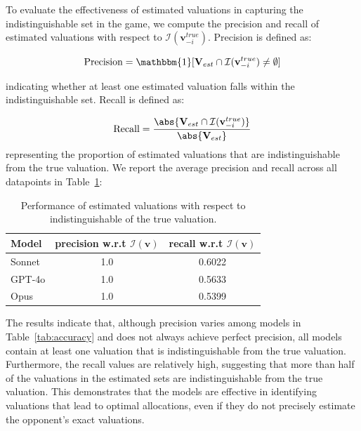 To evaluate the effectiveness of estimated valuations in capturing the indistinguishable set in the game, we compute the precision and recall of estimated valuations with respect to $\mathcal{I}(\mathbf{v}_{-i}^{true})$. Precision is defined as:

$$\text{Precision} = \mathbbm{1}[\mathbf{V}_{est}\cap\mathcal{I}(\mathbf{v}_{-i}^{true})\neq\emptyset]$$

indicating whether at least one estimated valuation falls within the indistinguishable set. Recall is defined as:

$$\text{Recall} = \frac{\abs{\mathbf{V}_{est}\cap\mathcal{I}(\mathbf{v}_{-i}^{true})}}{\abs{\mathbf{V}_{est}}}$$ representing the proportion of estimated valuations that are indistinguishable from the true valuation. We report the average precision and recall across all datapoints in Table~\ref{tab:indistinguishable}:
\begin{table}[!ht]
    \centering
    \setlength{\tabcolsep}{10pt}
    \begin{tabular}{lcc}
    \toprule
        Model & precision w.r.t $\mathcal{I}(\mathbf{v})$ & recall w.r.t $\mathcal{I}(\mathbf{v})$\\
        \midrule
        Sonnet & 1.0 & 0.6022\\
        GPT-4o & 1.0 & 0.5633\\
        Opus & 1.0 & 0.5399\\
        \bottomrule
    \end{tabular}
    \caption{Performance of estimated valuations with respect to indistinguishable of the true valuation.}
    \label{tab:indistinguishable}
\end{table}

The results indicate that, although precision varies among models in Table~\ref{tab:accuracy} and does not always achieve perfect precision, all models contain at least one valuation that is indistinguishable from the true valuation. Furthermore, the recall values are relatively high, suggesting that more than half of the valuations in the estimated sets are indistinguishable from the true valuation. This demonstrates that the models are effective in identifying valuations that lead to optimal allocations, even if they do not precisely estimate the opponent's exact valuations.

